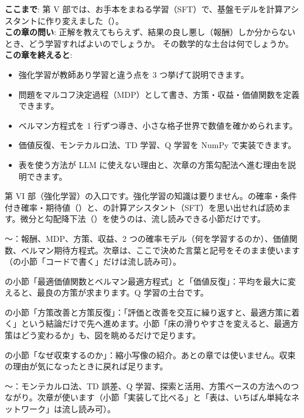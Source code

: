 \begin{chapterlead}
\textbf{ここまで}: 第 V 部では、お手本をまねる学習（SFT）で、基盤モデルを計算アシスタントに作り変えました（）。\\
\textbf{この章の問い}: 正解を教えてもらえず、結果の良し悪し（報酬）しか分からないとき、どう学習すればよいのでしょうか。
その数学的な土台は何でしょうか。\\
\textbf{この章を終えると}:
\begin{itemize}
\item 強化学習が教師あり学習と違う点を 3 つ挙げて説明できます。
\item 問題をマルコフ決定過程（MDP）として書き、方策・収益・価値関数を定義できます。
\item ベルマン方程式を 1 行ずつ導き、小さな格子世界で数値を確かめられます。
\item 価値反復、モンテカルロ法、TD 学習、Q 学習を NumPy で実装できます。
\item 表を使う方法が LLM に使えない理由と、次章の方策勾配法へ進む理由を説明できます。
\end{itemize}
\end{chapterlead}

\begin{readingguide}
\item[\rgpre] 第 VI 部（強化学習）の入口です。強化学習の知識は要りません。の確率・条件付き確率・期待値（）と、の計算アシスタント（SFT）を思い出せれば読めます。微分と勾配降下法（）を使うのは、流し読みできる小節だけです。
\item[\rgmust] 〜：報酬、MDP、方策、収益、2 つの確率モデル（何を学習するのか）、価値関数、ベルマン期待方程式。次章は、ここで決めた言葉と記号をそのまま使います（の小節「コードで書く」だけは流し読み可）。
\item[\rgmust] の小節「最適価値関数とベルマン最適方程式」と「価値反復」：平均を最大に変えると、最良の方策が求まります。Q 学習の土台です。
\item[\rgskim] の小節「方策改善と方策反復」：「評価と改善を交互に繰り返すと、最適方策に着く」という結論だけで先へ進めます。小節「床の滑りやすさを変えると、最適方策はどう変わるか」も、図を眺めるだけで足ります。
\item[\rglater] の小節「なぜ収束するのか」：縮小写像の紹介。あとの章では使いません。収束の理由が気になったときに戻れば足ります。
\item[\rgmust] 〜：モンテカルロ法、TD 誤差、Q 学習、探索と活用、方策ベースの方法へのつながり。次章が使います（小節「実装して比べる」と「表は、いちばん単純なネットワーク」は流し読み可）。
\end{readingguide}

